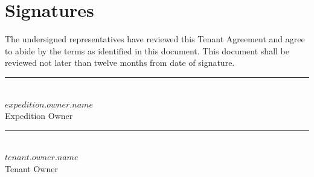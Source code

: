 \documentclass[11pt]{article}
\begin{document}
  \section*{Signatures}
    The undersigned representatives have reviewed this Tenant Agreement and agree to abide by the terms as identified in this document. This document shall be reviewed not later than twelve months from  date of signature.
    \vspace{2in} 

    \noindent
    \begin{minipage}[t]{0.4\textwidth}
      \rule{2in}{0.4pt} \\ 
      $expedition.owner.name$ \\
      Expedition Owner
    \end{minipage}
    \hspace{0.1\textwidth}
    \begin{minipage}[t]{0.4\textwidth}
      \rule{2in}{0.4pt} \\ 
      $tenant.owner.name$ \\
      Tenant Owner
    \end{minipage}
\end{document}

